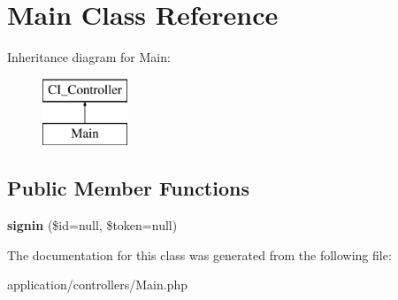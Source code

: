 \hypertarget{class_main}{}\section{Main Class Reference}
\label{class_main}
Inheritance diagram for Main\+:\begin{figure}[H]
\begin{center}
\leavevmode
\includegraphics[height=2.000000cm]{class_main}
\end{center}
\end{figure}
\subsection*{Public Member Functions}
\begin{DoxyCompactItemize}
\item 
\mbox{\label{class_main_a581fc1016bc76cba4fad0fc9a9f3f9cd}} 
{\bfseries signin} (\$id=null, \$token=null)
\end{DoxyCompactItemize}


The documentation for this class was generated from the following file\+:\begin{DoxyCompactItemize}
\item 
application/controllers/Main.\+php\end{DoxyCompactItemize}
